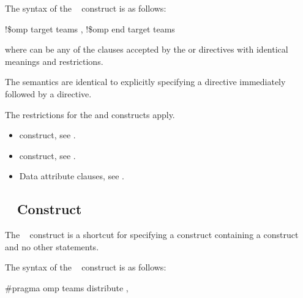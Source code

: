 \fortranspecificstart
The syntax of the ~ construct is as follows:

\begin{boxedcode}
!\$omp target teams \plc{[clause[ [},\plc{] clause] ... ]}
!\$omp end target teams
\end{boxedcode}

where  can be any of the clauses accepted by the  or  directives 
with identical meanings and restrictions.
\fortranspecificend

\descr

The semantics are identical to explicitly specifying a  directive 
immediately followed by a  directive. 

\restrictions
The restrictions for the  and  constructs apply.

\crossreferences
\begin{itemize}
\item {} construct, see 
.

\item {} construct, see 
.

\item Data attribute clauses, see 
.
\end{itemize}









\subsection{~ Construct}
\label{subsec:teams distribute Construct}
\summary
The ~ construct is a shortcut for specifying a  construct 
containing a  construct and no other statements.

\syntax
\ccppspecificstart
The syntax of the ~ construct is as follows:

\begin{boxedcode}
\#pragma omp teams distribute \plc{[clause[ [},\plc{] clause] ... ]}
\end{boxedcode}

